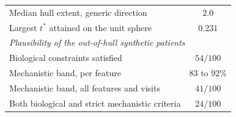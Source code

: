 \begin{table}[ht]
{\begin{tabular}{lcc}
Median hull extent, generic direction       & \multicolumn{2}{c}{$2.0$} \\
Largest $t^{*}$ attained on the unit sphere & \multicolumn{2}{c}{$0.231$} \\
\midrule
\multicolumn{3}{l}{\emph{Plausibility of the out-of-hull synthetic patients}} \\
Biological constraints satisfied            & \multicolumn{2}{c}{$54/100$} \\
Mechanistic band, per feature               & \multicolumn{2}{c}{$83$ to $92\%$} \\
Mechanistic band, all features and visits   & \multicolumn{2}{c}{$41/100$} \\
Both biological and strict mechanistic criteria & \multicolumn{2}{c}{$24/100$} \\
\bottomrule
\end{tabular}
}
\end{table}

